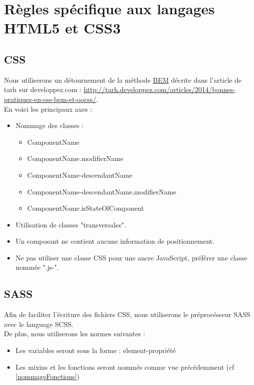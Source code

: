 
\section{Règles spécifique aux langages HTML5 et CSS3}

\subsection{CSS}
Nous utiliserons un détournement de la méthode \href{http://getbem.com/}{BEM} décrite dans l'article de tarh sur developpez.com : \url{http://tarh.developpez.com/articles/2014/bonnes-pratiques-en-css-bem-et-oocss/}.\\
En voici les principaux axes :
\begin{itemize}[label=\textbullet]
  \item Nommage des classes :
  \begin{itemize}
    \item ComponentName
    \item ComponentName.modifierName
    \item ComponentName-descendantName
    \item ComponentName-descendantName.modifierName
    \item ComponentName.isStateOfComponent
  \end{itemize}
  \item Utilisation de classes "transversales".
  \item Un composant ne contient aucune information de positionnement.
  \item Ne pas utiliser une classe CSS pour une ancre JavaScript, préférer une classe nommée ".js-".
\end{itemize}

\subsection{SASS}
Afin de faciliter l'écriture des fichiers CSS, nous utiliserons le préprocésseur SASS avec le language SCSS.\\
De plus, nous utiliserons les normes suivantes :
\begin{itemize}[label=\textbullet]
  \item Les variables seront sous la forme : element-propriété
  \item Les mixins et les fonctions seront nommés comme vue précédemment (cf \ref{nommageFonctions})
\end{itemize}
